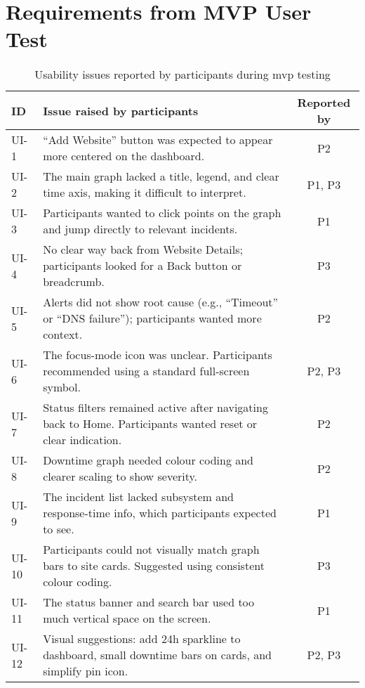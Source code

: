 \section{Requirements from MVP User Test}
\label{app:req_mvp_user_test}

\begin{table}[htbp]
\centering
\caption{Usability issues reported by participants during \acrshort{mvp} testing}
\label{tab:mvp-issues}
\begin{tabular}{|@{}l |p{9cm} |c |}
\toprule
\textbf{ID} & \textbf{Issue raised by participants} & \textbf{Reported by} \\
\midrule
UI-1  & “Add Website” button was expected to appear more centered on the dashboard.& P2\\ \hline 
UI-2  & The main graph lacked a title, legend, and clear time axis, making it difficult to interpret. & P1, P3 \\ \hline 
UI-3  & Participants wanted to click points on the graph and jump directly to relevant incidents. & P1 \\ \hline 
UI-4  & No clear way back from Website Details; participants looked for a Back button or breadcrumb. & P3 \\ \hline 
UI-5  & Alerts did not show root cause (e.g., “Timeout” or “DNS failure”); participants wanted more context. & P2 \\ \hline 
UI-6  & The focus-mode icon was unclear. Participants recommended using a standard full-screen symbol. & P2, P3 \\ \hline 
UI-7  & Status filters remained active after navigating back to Home. Participants wanted reset or clear indication. & P2 \\ \hline 
UI-8  & Downtime graph needed colour coding and clearer scaling to show severity. & P2 \\ \hline 
UI-9  & The incident list lacked subsystem and response-time info, which participants expected to see. & P1 \\ \hline 
UI-10 & Participants could not visually match graph bars to site cards. Suggested using consistent colour coding. & P3 \\ \hline 
UI-11 & The status banner and search bar used too much vertical space on the screen. & P1 \\
UI-12 & Visual suggestions: add 24h sparkline to dashboard, small downtime bars on cards, and simplify pin icon. & P2, P3 \\
\bottomrule \hline
\end{tabular}
\end{table}